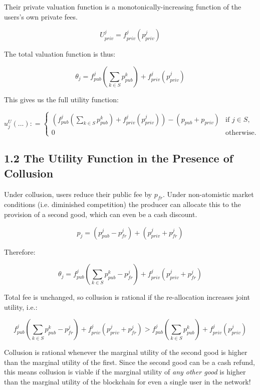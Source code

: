 \documentclass[oneside]{article}   	%
\begin{document}
Their private valuation function is a monotonically-increasing function of the users's own private fees.

$$
U_{priv}^j = f_{priv}^j(p_{priv}^j)
$$

The total valuation function is thus:

$$
\theta_j = f_{pub}^j\left(\sum_{k \in S} p_{pub}^{k}\right) + f_{priv}^j(p_{priv}^j)
$$

This gives us the full utility function:

\[
u_j^U\left(...\right) : =
\begin{cases}
\left(
	f_{pub}^j
		\left(\sum_{k \in S} p_{pub}^{k}\right) 
		+ f_{priv}^j(p_{priv}^j) 
\right)  -   \left(p_{pub} + p_{priv}\right) & \text{if } j \in S, \\ 0 & \text{otherwise.}
\end{cases}
\]

\subsection*{1.2 The Utility Function in the Presence of Collusion}
\vspace{0.5em}

Under collusion, users reduce their public fee by $p_{fr}$. Under non-atomistic market conditions (i.e. diminished competition) the producer can allocate this to the provision of a second good, which can even be a cash discount.

$$
p_j = \left( p_{pub}^j - p_{fr}^j \right) + \left( p_{priv}^j + p_{fr}^j \right)
$$

Therefore:

$$
\theta_j = f_{pub}^j\left(\sum_{k \in S} p_{pub}^{k} - p_{fr}^j \right) + f_{priv}^j( p_{priv}^j + p_{fr}^j )
$$

Total fee is unchanged, so collusion is rational if the re-allocation increases joint utility, i.e.:

\[
f_{pub}^j\left(\sum_{k \in S} p_{pub}^{k} - p_{fr}^j \right) + f_{priv}^j( p_{priv}^j + p_{fr}^j )
> 
f_{pub}^j\left(\sum_{k \in S} p_{pub}^{k}\right) + f_{priv}^j(p_{priv}^j)
\]

Collusion is rational whenever the marginal utility of the second good is higher than the marginal utility of the first. Since the second good can be a cash refund, this means collusion is viable if the marginal utility of \textit{any other good} is higher than the marginal utility of the blockchain for even a single user in the network!
\end{document}
